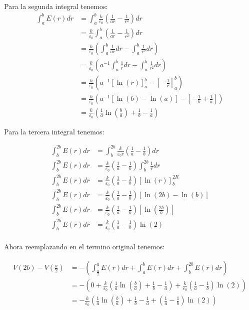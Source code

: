 \documentclass{report}
\begin{document}
Para la segunda integral tenemos:
\begin{align*}
	\int_{a}^{b} E(r) dr &= \int_a^b \frac{k}{\varepsilon_0} \left(\frac{1}{ar} - \frac{1}{r^2}\right) dr\\
	&= \frac{k}{\varepsilon_0} \int_a^b  \left(\frac{1}{ar} - \frac{1}{r^2}\right) dr\\
	&= \frac{k}{\varepsilon_0} \left(\int_a^b  \frac{1}{ar} dr - \int_a^b \frac{1}{r^2} dr\right)\\
	&= \frac{k}{\varepsilon_0} \left(a^{-1}\int_a^b  \frac{1}{r} dr - \int_a^b \frac{1}{r^2} dr\right)\\
	&= \frac{k}{\varepsilon_0} \left(a^{-1}\left[\ln(r) \right]_a^{b} - \left[ - \frac{1}{r} \right]_a^b \right)\\
	&= \frac{k}{\varepsilon_0} \left(a^{-1}\left[\ln(b) - \ln(a)\right] - \left[ - \frac{1}{b} + \frac{1}{a}\right]\right)\\
	&= \frac{k}{\varepsilon_0} \left(\frac{1}{a}\ln\left(\frac{b}{a}\right) + \frac{1}{b} - \frac{1}{a}\right)
\end{align*}

Para la tercera integral tenemos:

\begin{align*}
	\int_{b}^{2b} E(r) dr &= \int_{b}^{2b} \frac{k}{\varepsilon_0 r} \left(\frac{1}{a} - \frac{1}{b}\right) dr\\
	\int_{b}^{2b} E(r) dr &= \frac{k}{\varepsilon_0} \left(\frac{1}{a} - \frac{1}{b}\right) \int_{b}^{2b} \frac{1}{r}  dr\\
	\int_{b}^{2b} E(r) dr &= \frac{k}{\varepsilon_0} \left(\frac{1}{a} - \frac{1}{b}\right) \left[\ln (r) \right]_{b}^{2R} \\
	\int_{b}^{2b} E(r) dr &= \frac{k}{\varepsilon_0} \left(\frac{1}{a} - \frac{1}{b}\right) \left[\ln(2b) - \ln(b) \right] \\
	\int_{b}^{2b} E(r) dr &= \frac{k}{\varepsilon_0} \left(\frac{1}{a} - \frac{1}{b}\right) \left[\ln\left(\frac{2b}{b}\right)\right] \\
	\int_{b}^{2b} E(r) dr &= \frac{k}{\varepsilon_0} \left(\frac{1}{a} - \frac{1}{b}\right)\ln(2)\\
\end{align*}

Ahora reemplazando en el termino original tenemos:

\begin{align*}
	V(2b) - V\left(\frac{a}{2}\right) &= - \left(\int_{\frac{a}{2}}^{a} E(r) dr + \int_{a}^{b} E(r) dr + \int_{b}^{2b} E(r) dr\right)\\
	&= - \left(0 + \frac{k}{\varepsilon_0} \left(\frac{1}{a}\ln\left(\frac{b}{a}\right) + \frac{1}{b} - \frac{1}{a}\right) + \frac{k}{\varepsilon_0} \left(\frac{1}{a} - \frac{1}{b}\right)\ln(2)\right)\\
	&= - \frac{k}{\varepsilon_0} \left(\frac{1}{a}\ln\left(\frac{b}{a}\right) + \frac{1}{b} - \frac{1}{a} + \left(\frac{1}{a} - \frac{1}{b}\right)\ln(2)\right)\\
\end{align*}
\end{document}
